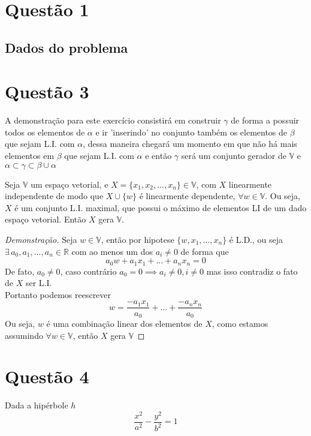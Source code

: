 \documentclass[12pt,letterpaper]{article}
\begin{document}
\section*{Questão 1}
\subsection*{Dados do problema}

\newpage
\section*{Questão 3}
A demonstração para este exercício consistirá em construir \(\gamma\) de forma a possuir todos os elementos de \(\alpha\) e ir 'inserindo' no conjunto também os elementos de \(\beta\) que sejam L.I. com \(\alpha\), dessa maneira chegará um momento em que não há mais elementos em \(\beta\) que sejam L.I. com \(\alpha\) e então \(\gamma\) será um conjunto gerador de \(\mathbb{V}\) e \(\alpha \subset \gamma \subset \beta \cup \alpha \)

\begin{boxlemma}
  Seja \(\mathbb{V}\) um espaço vetorial, e \(X = \{x_1, x_2, \dots, x_n \} \in \mathbb{V} \), com \(X\) linearmente independente de modo que \(X \cup \{w\}\) é linearmente dependente, \(\forall w \in \mathbb{V}\). Ou seja, \(X\) é um conjunto L.I. maximal, que possui o máximo de elementos LI de um dado espaço vetorial. Então \(X\) gera \(\mathbb{V}\).
  \begin{proof}[Demonstração]
    Seja \(w \in \mathbb{V}\), então por hipotese \(\{w,x_1,\dots,x_n\}\) é L.D., ou seja \(\exists \, a_0,a_1,\dots,a_n \in \mathbb{R}\) com ao menos um dos \(a_i \neq 0\) de forma que
    \[
    a_0w + a_1x_1 + \dots + a_nx_n = 0
    \]
    De fato, \(a_0 \neq 0\), caso contrário \(a_0 = 0 \implies a_i \neq 0, i \neq 0\) mas isso contradiz o fato de \(X\) ser L.I.\\
    Portanto podemos reescrever
    \[
    w = \frac{-a_1x_1}{a_0} + \dots + \frac{-a_nx_n}{a_0}
    \]
    Ou seja, \(w\) é uma combinação linear dos elementos de \(X\), como estamos assumindo \(\forall w \in \mathbb{V}\), então \(X\) gera \(\mathbb{V}\)
  \end{proof}
\end{boxlemma}


\newpage
\section*{Questão 4}
Dada a hipérbole \(h\)
\[
\frac{x^2}{a^2} - \frac{y^2}{b^2} = 1
\]
\end{document}
